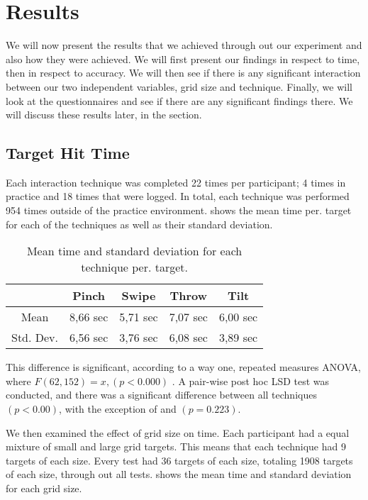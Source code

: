 \section{Results}
We will now present the results that we achieved through out our experiment and also how they were achieved. We will first present our findings in respect to time, then in respect to accuracy. We will then see if there is any significant interaction between our two independent variables, grid size and technique. Finally, we will look at the questionnaires and see if there are any significant findings there. We will discuss these results later, in the  section.  

\subsection{Target Hit Time}

Each interaction technique was completed 22 times per participant; 4 times in practice and 18 times that were logged. In total, each technique was performed 954 times outside of the practice environment.  shows the mean time per. target for each of the techniques as well as their standard deviation. 
\begin{table}[H]
	\centering
	\begin{tabular}{|c|c|c|c|c|}
		\hline
		\rowcolor[HTML]{9B9B9B} 
		 & \textbf{Pinch} & \textbf{Swipe} & \textbf{Throw} & \textbf{Tilt} \\ \hline
		Mean & 8,66  sec         & 5,71 sec          & 7,07 sec          & 6,00 sec         \\ \hline
		Std. Dev. & 6,56 sec & 3,76 sec & 6,08 sec & 3,89 sec \\ \hline
	\end{tabular}
	\caption{Mean time and standard deviation for each technique per. target.}
	\label{tab:meanTimesTechnique}
\end{table}

This difference is significant, according to a way one, repeated measures ANOVA, where $F(62,152) = x, (p<0.000)$ . A pair-wise post hoc LSD test was conducted, and there was a significant difference between all techniques $(p<0.00)$, with the exception of \swipe and \tilt $(p=0.223)$. 

We then examined the effect of grid size on time. Each participant had a equal mixture of small and large grid targets. This means that each technique had 9 targets of each size. Every test had 36 targets of each size, totaling 1908 targets of each size, through out all tests.  shows the mean time and standard deviation for each grid size. 

